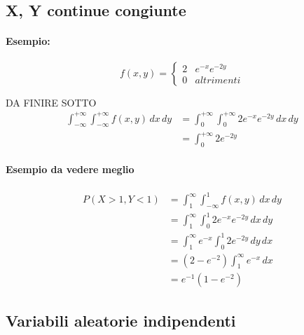 \documentclass[]{article}
\begin{document}
    \subsection{X, Y continue congiunte}
    \paragraph{Esempio:}
    \begin{equation*}
        f(x,y) =
        \begin{cases}
            2 & e^{-x} e^{-2y} \\
            0 & altrimenti
        \end{cases}
    \end{equation*}

    DA FINIRE SOTTO
    \begin{equation*}
        \begin{split}
            \int_{-\infty}^{+\infty}\int_{-\infty}^{+\infty} f(x,y) \, dx \, dy & = \int_{0}^{+\infty}\int_{0}^{+\infty} 2e^{-x}e^{-2y} \, dx \, dy \\
            & = \int_{0}^{+\infty} 2 e^{-2y}
        \end{split}
    \end{equation*}

    \paragraph{Esempio da vedere meglio}
    \begin{equation*}
        \begin{split}
            P(X > 1, Y < 1) & = \int_{1}^{\infty} \int_{-\infty}^{1} f(x,y) \, dx \, dy \\
            & = \int_{1}^{\infty} \int_{0}^{1} 2e^{-x} e^{-2y} \, dx \, dy \\
            & = \int_{1}^{\infty} e^{-x} \int_{0}^{1} 2e^{-2y} \, dy \, dx \\
            & = (2 - e^{-2}) \int_{1}^{\infty} e^{-x} \, dx \\
            & = e^{-1}(1 - e^{-2})
        \end{split}
    \end{equation*}

    \subsection{Variabili aleatorie indipendenti}
\end{document}
